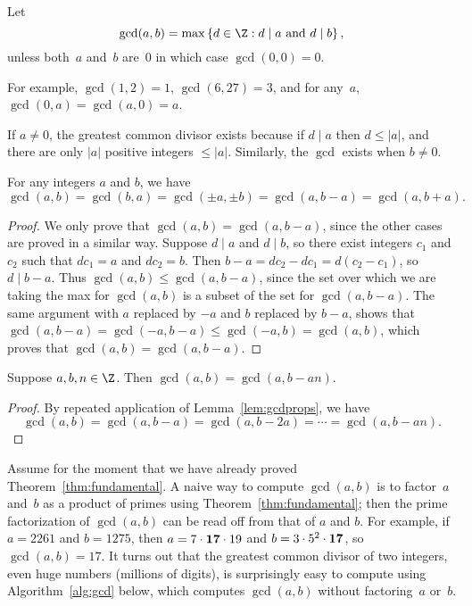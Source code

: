 \begin{definition}
Let
$$
  \gcd(a,b)=\max\left\{d\in \Z : d \mid a\text{ and } d\mid b\right\},
$$
unless both~$a$ and~$b$ are~$0$ in which case
$\gcd(0,0)=0$.
\end{definition}
For example,
$\gcd(1,2)=1$,
$\gcd(6,27)=3$, and
for any~$a$,
$\gcd(0,a)=\gcd(a,0)=a$.

If $a\neq 0$, the greatest common divisor exists because if $d\mid a$
then $d\leq |a|$, and there are only $|a|$ positive integers $\leq |a|$.
Similarly, the $\gcd$ exists when $b\neq 0$.

\begin{lemma}\label{lem:gcdprops}
For any integers $a$ and $b$, we have
$$
   \gcd(a,b)= \gcd(b,a) = \gcd(\pm a, \pm b) = \gcd(a,b-a) = \gcd(a,b+a).
$$
\end{lemma}
\begin{proof}
  We only prove that $\gcd(a,b) = \gcd(a,b-a)$, since the other cases
are proved in a similar way. Suppose $d\mid a$ and
  $d\mid b$, so there exist integers $c_1$ and $c_2$ such that $dc_1 =
  a$ and $dc_2 = b$.  Then $b - a = dc_2 - dc_1 = d(c_2-c_1)$, so
  $d\mid b-a$.  Thus $\gcd(a,b)\leq \gcd(a,b-a)$, since the set over
  which we are taking the max for $\gcd(a,b)$ is a subset of the set
  for $\gcd(a,b-a)$.  The same argument with $a$ replaced by $-a$
  and $b$ replaced by $b-a$, shows that $\gcd(a,b-a)=\gcd(-a,b-a)\leq
  \gcd(-a,b)=\gcd(a,b)$, which proves that $\gcd(a,b)=\gcd(a,b-a)$.
\end{proof}

\begin{lemma}\label{lem:gcdprops2}
Suppose $a,b,n\in\Z$.  Then
$\gcd(a,b) = \gcd(a,b-an)$.
\end{lemma}
\begin{proof}
By repeated application of Lemma~\ref{lem:gcdprops}, we have
$$
  \gcd(a,b) = \gcd(a,b-a) = \gcd(a,b-2a) = \cdots = \gcd(a,b-an).
$$
\end{proof}

Assume for the moment that we have already proved
Theorem~\ref{thm:fundamental}.  A naive way to compute
$\gcd(a,b)$ is to factor~$a$ and~$b$ as a product of primes using
Theorem~\ref{thm:fundamental}; then the prime factorization of
$\gcd(a,b)$ can be read off from that of $a$ and $b$.  For example, if
$a=2261$ and $b=1275$, then $a=7\cdot {\bf 17}\cdot 19$ and $b=3\cdot
5^2\cdot {\bf 17}$, so $\gcd(a,b) = 17$.  It turns out that the
greatest common divisor of two integers, even huge numbers (millions
of digits), is surprisingly easy to compute using
Algorithm~\ref{alg:gcd} below, which computes $\gcd(a,b)$ without
factoring~$a$ or~$b$.  

